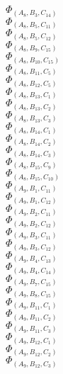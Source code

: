 \documentclass[14pt]{article}
\begin{document}
    $\Phi_{({A}_{8}, {B}_{3}, {C}_{14})}$ \\ 
    $\Phi_{({A}_{8}, {B}_{5}, {C}_{11})}$ \\ 
    $\Phi_{({A}_{8}, {B}_{5}, {C}_{12})}$ \\ 
    $\Phi_{({A}_{8}, {B}_{9}, {C}_{15})}$ \\ 
    $\Phi_{({A}_{8}, {B}_{10}, {C}_{15})}$ \\ 
    $\Phi_{({A}_{8}, {B}_{11}, {C}_{5})}$ \\ 
    $\Phi_{({A}_{8}, {B}_{12}, {C}_{5})}$ \\ 
    $\Phi_{({A}_{8}, {B}_{13}, {C}_{1})}$ \\ 
    $\Phi_{({A}_{8}, {B}_{13}, {C}_{2})}$ \\ 
    $\Phi_{({A}_{8}, {B}_{13}, {C}_{3})}$ \\ 
    $\Phi_{({A}_{8}, {B}_{14}, {C}_{1})}$ \\ 
    $\Phi_{({A}_{8}, {B}_{14}, {C}_{2})}$ \\ 
    $\Phi_{({A}_{8}, {B}_{14}, {C}_{3})}$ \\ 
    $\Phi_{({A}_{8}, {B}_{15}, {C}_{9})}$ \\ 
    $\Phi_{({A}_{8}, {B}_{15}, {C}_{10})}$ \\ 
    $\Phi_{({A}_{9}, {B}_{1}, {C}_{11})}$ \\ 
    $\Phi_{({A}_{9}, {B}_{1}, {C}_{12})}$ \\ 
    $\Phi_{({A}_{9}, {B}_{2}, {C}_{11})}$ \\ 
    $\Phi_{({A}_{9}, {B}_{2}, {C}_{12})}$ \\ 
    $\Phi_{({A}_{9}, {B}_{3}, {C}_{11})}$ \\ 
    $\Phi_{({A}_{9}, {B}_{3}, {C}_{12})}$ \\ 
    $\Phi_{({A}_{9}, {B}_{4}, {C}_{13})}$ \\ 
    $\Phi_{({A}_{9}, {B}_{4}, {C}_{14})}$ \\ 
    $\Phi_{({A}_{9}, {B}_{7}, {C}_{15})}$ \\ 
    $\Phi_{({A}_{9}, {B}_{8}, {C}_{15})}$ \\ 
    $\Phi_{({A}_{9}, {B}_{11}, {C}_{1})}$ \\ 
    $\Phi_{({A}_{9}, {B}_{11}, {C}_{2})}$ \\ 
    $\Phi_{({A}_{9}, {B}_{11}, {C}_{3})}$ \\ 
    $\Phi_{({A}_{9}, {B}_{12}, {C}_{1})}$ \\ 
    $\Phi_{({A}_{9}, {B}_{12}, {C}_{2})}$ \\ 
    $\Phi_{({A}_{9}, {B}_{12}, {C}_{3})}$ \\ 
\end{document}
